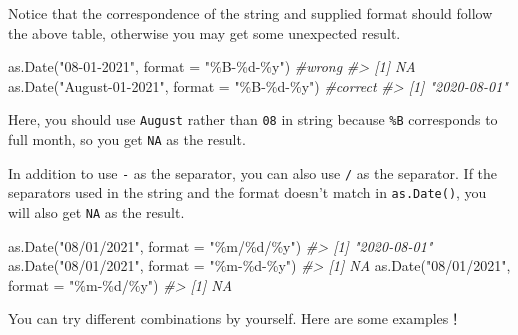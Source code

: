\documentclass[
]{book}
\newenvironment{Shaded}{\begin{snugshade}}{\end{snugshade}}
\newcommand{\AttributeTok}[1]{\textcolor[rgb]{0.77,0.63,0.00}{#1}}
\newcommand{\CommentTok}[1]{\textcolor[rgb]{0.56,0.35,0.01}{\textit{#1}}}
\newcommand{\FunctionTok}[1]{\textcolor[rgb]{0.00,0.00,0.00}{#1}}
\newcommand{\NormalTok}[1]{#1}
\newcommand{\StringTok}[1]{\textcolor[rgb]{0.31,0.60,0.02}{#1}}
\begin{document}
Notice that the correspondence of the string and supplied format should follow the above table, otherwise you may get some unexpected result.

\begin{Shaded}
\begin{Highlighting}[]
\FunctionTok{as.Date}\NormalTok{(}\StringTok{"08{-}01{-}2021"}\NormalTok{, }\AttributeTok{format =} \StringTok{"\%B{-}\%d{-}\%y"}\NormalTok{)        }\CommentTok{\#wrong}
\CommentTok{\#\textgreater{} [1] NA}
\FunctionTok{as.Date}\NormalTok{(}\StringTok{"August{-}01{-}2021"}\NormalTok{, }\AttributeTok{format =} \StringTok{"\%B{-}\%d{-}\%y"}\NormalTok{)    }\CommentTok{\#correct}
\CommentTok{\#\textgreater{} [1] "2020{-}08{-}01"}
\end{Highlighting}
\end{Shaded}

Here, you should use \texttt{August} rather than \texttt{08} in string because \texttt{\%B} corresponds to full month, so you get \texttt{NA} as the result.

In addition to use \texttt{-} as the separator, you can also use \texttt{/} as the separator. If the separators used in the string and the format doesn't match in \texttt{as.Date()}, you will also get \texttt{NA} as the result.

\begin{Shaded}
\begin{Highlighting}[]
\FunctionTok{as.Date}\NormalTok{(}\StringTok{"08/01/2021"}\NormalTok{, }\AttributeTok{format =} \StringTok{"\%m/\%d/\%y"}\NormalTok{)}
\CommentTok{\#\textgreater{} [1] "2020{-}08{-}01"}
\FunctionTok{as.Date}\NormalTok{(}\StringTok{"08/01/2021"}\NormalTok{, }\AttributeTok{format =} \StringTok{"\%m{-}\%d{-}\%y"}\NormalTok{)}
\CommentTok{\#\textgreater{} [1] NA}
\FunctionTok{as.Date}\NormalTok{(}\StringTok{"08/01/2021"}\NormalTok{, }\AttributeTok{format =} \StringTok{"\%m{-}\%d/\%y"}\NormalTok{)}
\CommentTok{\#\textgreater{} [1] NA}
\end{Highlighting}
\end{Shaded}

You can try different combinations by yourself. Here are some examples！
\end{document}
